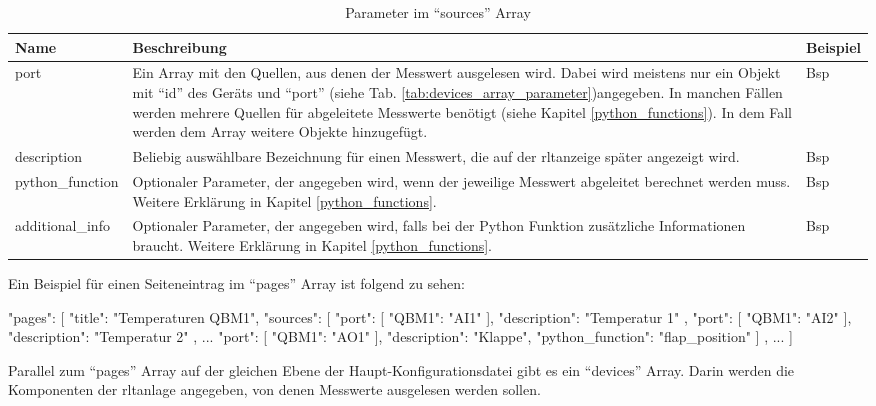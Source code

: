 \begin{enumerate}
		\begin{table}[H]
			\caption{Parameter im \enquote{sources} Array}
			\label{tab:sources_array_parameter}
			\begin{tabularx}{\textwidth}{@{}lX|X@{}}
				\toprule
				\textbf{Name} & \textbf{Beschreibung} & \textbf{Beispiel} \\
				\midrule
				port                & Ein Array mit den Quellen, aus denen der Messwert ausgelesen wird. Dabei wird meistens nur ein Objekt mit \enquote{id} des Geräts und \enquote{port} (siehe Tab. \ref{tab:devices_array_parameter})angegeben. In manchen Fällen werden mehrere Quellen für abgeleitete Messwerte benötigt (siehe Kapitel \ref{python_functions}). In dem Fall werden dem Array weitere Objekte hinzugefügt. & Bsp \\
				description         & Beliebig auswählbare Bezeichnung für einen Messwert, die auf der \acs{rltanzeige} später angezeigt wird. & Bsp \\
				python\_function    & Optionaler Parameter, der angegeben wird, wenn der jeweilige Messwert abgeleitet berechnet werden muss. Weitere Erklärung in Kapitel \ref{python_functions}. & Bsp \\
				additional\_info    & Optionaler Parameter, der angegeben wird, falls bei der Python Funktion zusätzliche Informationen braucht. Weitere Erklärung in Kapitel \ref{python_functions}. & Bsp \\
				\bottomrule
			\end{tabularx}
		\end{table} 
		
	Ein Beispiel für einen Seiteneintrag im \enquote{pages} Array ist folgend zu sehen:
	
	\begin{jsoncode}
	"pages": [
		{
			"title": "Temperaturen QBM1",
			"sources": [
			{
				"port": [{ "QBM1": "AI1" }],
				"description": "Temperatur 1"
			},
			{
				"port": [{ "QBM1": "AI2" }],
				"description": "Temperatur 2"
			},
			...
			{
				"port": [{ "QBM1": "AO1" }],
				"description": "Klappe",
				"python_function": "flap_position"
			}
			]
		},
		...
	]
	\end{jsoncode}
	
		
	Parallel zum \enquote{pages} Array \bzw auf der gleichen Ebene der Haupt-Konfigurationsdatei gibt es ein \enquote{devices} Array. Darin werden die Komponenten der \acs{rltanlage} angegeben, von denen Messwerte ausgelesen werden sollen.
	

\end{enumerate}
